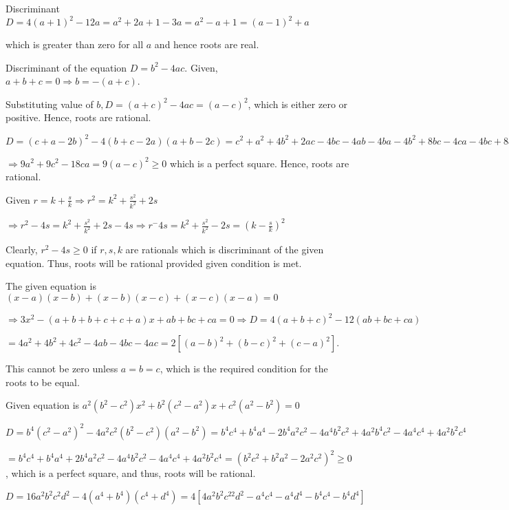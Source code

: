   Discriminant $D = 4(a + 1)^2 - 12a = a^2 + 2a + 1 - 3a = a^2 - a + 1 = (a - 1)^2 + a$

  which is greater than zero for all $a$ and hence roots are real.
\item Discriminant of the equation $D = b^2 - 4ac$. Given, $a + b + c = 0 \Rightarrow b = -(a + c)$.

  Substituting value of $b, D = (a + c)^2 - 4ac = (a - c)^2$, which is either zero or positive. Hence, roots
  are rational.
\item $D = (c + a - 2b)^2 - 4(b + c - 2a)(a + b - 2c) = c^2 + a^2 + 4b^2 + 2ac - 4bc - 4ab -4ba -4b^2 + 8bc
  - 4ca - 4bc + 8c^2 + 8a^2 + 8ab - 8ca$

  $\Rightarrow 9a^2 + 9c^2 - 18ca = 9(a - c)^2 \geq 0$ which is a perfect square. Hence, roots are rational.
\item Given $r = k + \frac{s}{k} \Rightarrow r^2 = k^2 + \frac{s^2}{k^2} + 2s$

  $\Rightarrow r^2 - 4s = k^2 + \frac{s^2}{k^2} + 2s - 4s\Rightarrow r^ - 4s = k^2 + \frac{s^2}{k^2} - 2s
  = \left(k - \frac{s}{k}\right)^2$

  Clearly, $r^2 - 4s \geq 0$ if $r, s, k$ are rationals which is discriminant of the given equation. Thus, roots will
  be rational provided given condition is met.
\item The given equation is $(x - a)(x - b) + (x - b)(x - c) + (x - c)(x - a) = 0$

  $\Rightarrow 3x^2 -(a + b + b + c + c + a)x + ab + bc + ca = 0\Rightarrow D = 4(a + b + c)^2 - 12(ab + bc + ca)$

  $= 4a^2 + 4b^2 + 4c^2 - 4ab - 4bc - 4ac = 2[(a - b)^2 + (b - c)^2 + (c - a)^2]$.

  This cannot be zero unless $a = b = c$, which is the required condition for the roots to be equal.
\item Given equation is $a^2(b^2 - c^2)x^2 + b^2(c^2 - a^2)x + c^2(a^2 - b^2) = 0$

  $D = b^4(c^2 - a^2)^2 - 4a^2c^2(b^2 - c^2)(a^2 - b^2) = b^4c^4 + b^4a^4 - 2b^4a^2c^2 - 4a^4b^2c^2 +
  4a^2b^4c^2 - 4a^4c^4 + 4a^2b^2c^4$

  $= b^4c^4 + b^4a^4 + 2b^4a^2c^2 - 4a^4b^2c^2 - 4a^4c^4 + 4a^2b^2c^4 = (b^2c^2 + b^2a^2 - 2a^2c^2)^2 \geq
  0$, which is a perfect square, and thus, roots will be rational.
\item $D = 16a^2b^2c^2d^2 - 4(a^4 + b^4)(c^4 + d^4) = 4[4a^2b^2c^22d^2 - a^4c^4 - a^4d^4 - b^4c^4 - b^4d^4]$

